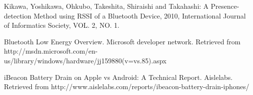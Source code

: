 
%
%
%
\begin{thebibliography}{1}

 Kikawa, Yoshikawa, Ohkubo, Takeshita, Shiraishi and Takahashi:  
 A Presence-detection Method using RSSI of a Bluetooth Device, 2010, International Journal of Informatics Society, VOL. 2, NO. 1. 

Bluetooth Low Energy Overview. Microsoft developer network. Retrieved from http://msdn.microsoft.com/en-us/library/windows/hardware/jj159880(v=vs.85).aspx

iBeacon Battery Drain on Apple vs Android: A Technical Report. Aislelabs. Retrieved from http://www.aislelabs.com/reports/ibeacon-battery-drain-iphones/



\end{thebibliography}
